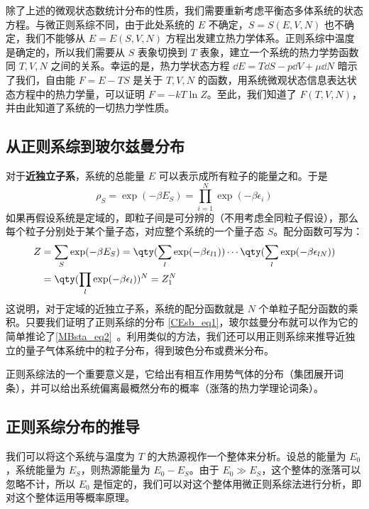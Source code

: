 除了上述的微观状态数统计分布的性质，我们需要重新考虑平衡态多体系统的状态方程。与微正则系综不同，由于此处系统的 $E$ 不确定，$S=S(E,V,N)$ 也不确定，我们不能够从 $E=E(S,V,N)$ 方程出发建立热力学体系。正则系综中温度是确定的，所以我们需要从 $S$ 表象切换到 $T$ 表象，建立一个系统的热力学势函数同 $T,V,N$ 之间的关系。幸运的是，热力学状态方程 $\dd E=T\dd S-p\dd V+\mu\dd N$ 暗示了我们，自由能 $F=E-TS$ 是关于 $T,V,N$ 的函数，用系统微观状态信息表达状态方程中的热力学量，可以证明 $F=-kT\ln Z$。至此，我们知道了 $F(T,V,N)$，并由此知道了系统的一切热力学性质。

\subsection{从正则系综到玻尔兹曼分布}
对于\textbf{近独立子系}，系统的总能量 $E$ 可以表示成所有粒子的能量之和。于是
\begin{equation}
\rho_S=\exp(-\beta E_S)=\prod_{i=1}^N\exp(-\beta\epsilon_i)
\end{equation}
如果再假设系统是定域的，即粒子间是可分辨的（不用考虑全同粒子假设），那么每个粒子分别处于某个量子态，对应整个系统的一个量子态 $S$。配分函数可写为：
\begin{equation}
\begin{aligned}
Z&=\sum_S\exp(-\beta E_S)=\qty(\sum_{l}\exp(-\beta\epsilon_{l1}))\cdots\qty(\sum_{l}\exp(-\beta\epsilon_{lN}))\\
&=\qty(\prod_{l}\exp(-\beta\epsilon_{l}))^N=Z_1^N
\end{aligned}
\end{equation}
这说明，对于定域的近独立子系，系统的配分函数就是 $N$ 个单粒子配分函数的乘积。只要我们证明了正则系综的分布 \autoref{CEsb_eq1}，玻尔兹曼分布就可以作为它的简单推论了\autoref{MBsta_eq2}~。利用类似的方法，我们还可以用正则系综来推导近独立的量子气体系统中的粒子分布，得到玻色分布或费米分布。

正则系综法的一个重要意义是，它给出有相互作用势气体的分布（集团展开词条），并可以给出系统偏离最概然分布的概率（涨落的热力学理论词条）。
\subsection{正则系综分布的推导}
我们可以将这个系统与温度为 $T$ 的大热源视作一个整体来分析。设总的能量为 $E_0$，系统能量为 $E_S$，则热源能量为 $E_0-E_S$。由于 $E_0\gg E_S$，这个整体的涨落可以忽略不计，所以 $E_0$ 是恒定的，我们可以对这个整体用微正则系综法进行分析，即对这个整体运用等概率原理。


